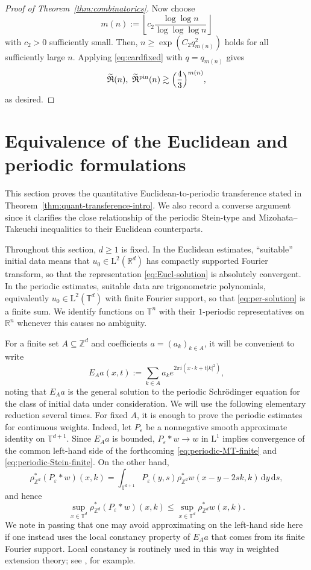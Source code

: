 \documentclass[10pt,a4paper]{amsart}
\numberwithin{equation}{section}
\newcommand{\dd}{\,\mathrm{d}}
\renewcommand{\leq}{\leqslant}
\renewcommand{\geq}{\geqslant}
\begin{document}
\begin{proof}[Proof of Theorem~\ref{thm:combinatorics}]
Now choose 
\[ m(n):=\left\lfloor c_2\frac{\log\log n}{\log\log\log n}\right\rfloor \]
with $c_2>0$ sufficiently small. Then, $n\geq\exp(C_2 q_{m(n)}^2)$ holds for all sufficiently large $n$.
Applying \eqref{eq:cardfixed} with $q=q_{m(n)}$ gives
\[ \widetilde{\mathfrak{R}}(n),\ \widetilde{\mathfrak{R}}^{\mathrm{pin}}(n) \gtrsim \Bigl(\frac{4}{3}\Bigr)^{m(n)}, \]
as desired.
\end{proof}


\section{Equivalence of the Euclidean and periodic formulations}
\label{sec:transference}
This section proves the quantitative Euclidean-to-periodic transference stated in Theorem~\ref{thm:quant-transference-intro}. We also record a converse argument since it clarifies the close relationship of the periodic Stein-type and Mizohata--Takeuchi inequalities to their Euclidean counterparts.

Throughout this section, $d\geq1$ is fixed. In the Euclidean estimates, ``suitable'' initial data means that $u_0\in \mathrm{L}^2(\mathbb{R}^d)$ has compactly supported Fourier transform, so that the representation \eqref{eq:Eucl-solution} is absolutely convergent. In the periodic estimates, suitable data are trigonometric polynomials, equivalently $u_0\in\mathrm{L}^2(\mathbb{T}^d)$ with finite Fourier support, so that \eqref{eq:per-solution} is a finite sum. We identify functions on $\mathbb{T}^n$ with their $1$-periodic representatives on $\mathbb{R}^n$ whenever this causes no ambiguity.

For a finite set $A\subseteq\mathbb{Z}^d$ and coefficients $a=(a_k)_{k\in A}$, it will be convenient to write
\[ E_Aa(x,t):=\sum_{k\in A}a_k e^{2\pi i(x\cdot k+t|k|^2)}, \]
noting that $E_Aa$ is the general solution to the periodic Schr\"{o}dinger equation for the class of initial data under consideration.
We will use the following elementary reduction several times. For fixed $A$, it is enough to prove the periodic estimates for continuous weights. Indeed, let $P_\varepsilon$ be a nonnegative smooth approximate identity on $\mathbb{T}^{d+1}$. Since $E_Aa$ is bounded, $P_\varepsilon\ast w\to w$ in $\mathrm{L}^1$ implies convergence of the common left-hand side of the forthcoming \eqref{eq:periodic-MT-finite} and \eqref{eq:periodic-Stein-finite}. On the other hand,
\[ \rho_{\mathbb{Z}^d}^{\ast}(P_\varepsilon\ast w)(x,k)
=\int_{\mathbb{T}^{d+1}}P_\varepsilon(y,s)\rho_{\mathbb{Z}^d}^{\ast}w(x-y-2sk,k)\dd y\dd s, \]
and hence
\[ \sup_{x\in\mathbb{T}^d}\rho_{\mathbb{Z}^d}^{\ast}(P_\varepsilon\ast w)(x,k)
\leq \sup_{x\in\mathbb{T}^d}\rho_{\mathbb{Z}^d}^{\ast}w(x,k). \]
We note in passing that one may avoid approximating on the left-hand side here if one instead uses the local constancy property of $E_Aa$ that comes from its finite Fourier support. Local constancy is routinely used in this way in weighted extension theory; see \cite{CIW}, for example.
\end{document}
